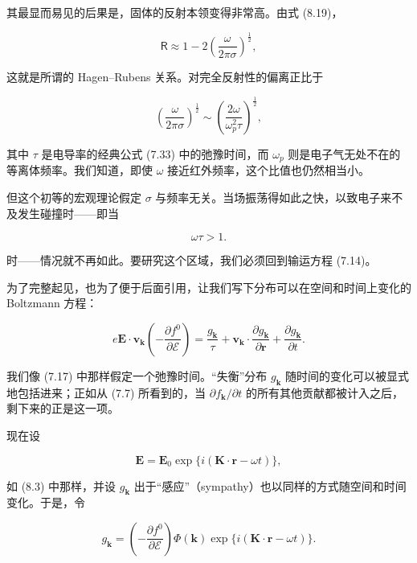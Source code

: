 其最显而易见的后果是，固体的反射本领变得非常高。由式 (8.19)，

\begin{equation*}
\mathsf{R} \approx 1 - 2\left(\frac{\omega}{2\pi\sigma}\right)^{\frac{1}{2}},
\tag{8.81}
\end{equation*}

这就是所谓的 Hagen--Rubens 关系。对完全反射性的偏离正比于

\begin{equation*}
\left(\frac{\omega}{2\pi\sigma}\right)^{\frac{1}{2}} \sim \left(\frac{2\omega}{\omega_p^2\tau}\right)^{\frac{1}{2}},
\tag{8.82}
\end{equation*}

其中 $\tau$ 是电导率的经典公式 (7.33) 中的弛豫时间，而 $\omega_p$ 则是电子气无处不在的等离体频率。我们知道，即使 $\omega$ 接近红外频率，这个比值也仍然相当小。

但这个初等的宏观理论假定 $\sigma$ 与频率无关。当场振荡得如此之快，以致电子来不及发生碰撞时——即当

\begin{equation*}
\omega\tau > 1.
\tag{8.83}
\end{equation*}

时——情况就不再如此。要研究这个区域，我们必须回到输运方程 (7.14)。

为了完整起见，也为了便于后面引用，让我们写下分布可以在空间和时间上变化的 Boltzmann 方程：

\begin{equation*}
e\mathbf{E}\cdot\mathbf{v}_{\mathbf{k}}\left(-\frac{\partial f^0}{\partial\mathcal{E}}\right) = \frac{g_{\mathbf{k}}}{\tau} + \mathbf{v}_{\mathbf{k}}\cdot\frac{\partial g_{\mathbf{k}}}{\partial\mathbf{r}} + \frac{\partial g_{\mathbf{k}}}{\partial t}.
\tag{8.84}
\end{equation*}

我们像 (7.17) 中那样假定一个弛豫时间。“失衡”分布 $g_{\mathbf{k}}$ 随时间的变化可以被显式地包括进来；正如从 (7.7) 所看到的，当 $\partial f_{\mathbf{k}}/\partial t$ 的所有其他贡献都被计入之后，剩下来的正是这一项。

现在设

\begin{equation*}
\mathbf{E} = \mathbf{E}_0\exp\{i(\mathbf{K}\cdot\mathbf{r}-\omega t)\},
\tag{8.85}
\end{equation*}

如 (8.3) 中那样，并设 $g_{\mathbf{k}}$ 出于“感应”（sympathy）也以同样的方式随空间和时间变化。于是，令

\begin{equation*}
g_{\mathbf{k}} = \left(-\frac{\partial f^0}{\partial\mathcal{E}}\right)\Phi(\mathbf{k})\exp\{i(\mathbf{K}\cdot\mathbf{r}-\omega t)\}.
\tag{8.86}
\end{equation*}

